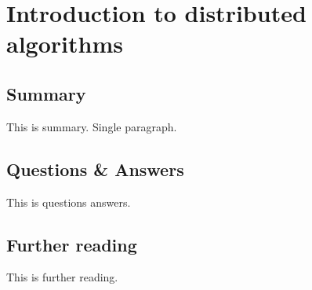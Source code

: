 \section{Introduction to distributed algorithms}

\subsection{Summary}
This is summary. Single paragraph.

\subsection{Questions \& Answers}
This is questions answers.

\subsection{Further reading}
This is further reading.
